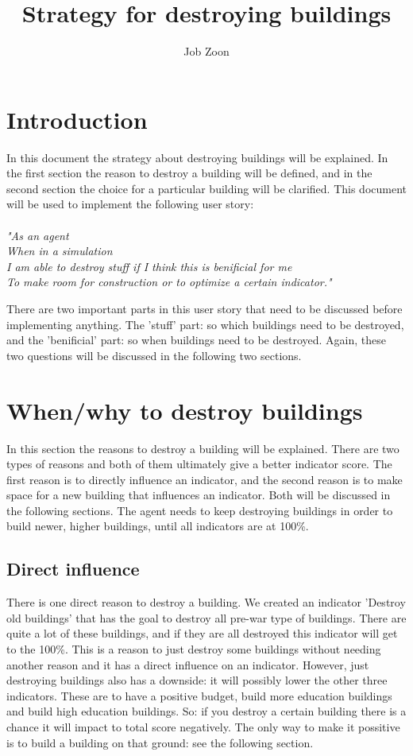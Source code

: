 \documentclass{article}
\author{Job Zoon}
\title{Strategy for destroying buildings}
\begin{document}

\maketitle{}
\newpage{}

\section{Introduction}
In this document the strategy about destroying buildings will be explained. In the first section the reason to destroy a building will be defined, and in the second section the choice for a particular building will be clarified. This document will be used to implement the following user story:\\
\\
\textit{"As an agent\\
When in a simulation\\
I am able to destroy stuff if I think 
this is benificial for me\\
To make room for construction or to 
optimize a certain indicator."\\}

There are two important parts in this user story that need to be discussed before implementing anything. The 'stuff' part: so which buildings need to be destroyed, and the 'benificial' part: so when buildings need to be destroyed. Again, these two questions will be discussed in the following two sections. 

\section{When/why to destroy buildings}
In this section the reasons to destroy a building will be explained. There are two types of reasons and both of them ultimately give a better indicator score. The first reason is to directly influence an indicator, and the second reason is to make space for a new building that influences an indicator. Both will be discussed in the following sections. The agent needs to keep destroying buildings in order to build newer, higher buildings, until all indicators are at 100\%.


\subsection{Direct influence}
There is one direct reason to destroy a building. We created an indicator 'Destroy old buildings' that has the goal to destroy all pre-war type of buildings. There are quite a lot of these buildings, and if they are all destroyed this indicator will get to the 100\%. This is a reason to just destroy some buildings without needing another reason and it has a direct influence on an indicator. However, just destroying buildings also has a downside: it will possibly lower the other three indicators. These are to have a positive budget, build more education buildings and build high education buildings. So: if you destroy a certain building there is a chance it will impact to total score negatively. The only way to make it possitive is to build a building on that ground: see the following section.
\end{document}
